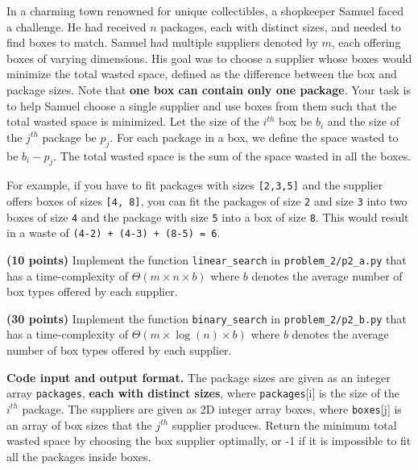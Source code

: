 \documentclass{hw}
\newcommand{\io}{\textbf{Code input and output format.} }
\begin{document}

\newpage %

\begin{problem}

In a charming town renowned for unique collectibles, a shopkeeper Samuel faced a challenge. He had received $n$ packages, each with distinct sizes, and needed to find boxes to match. Samuel had multiple suppliers denoted by $m$, each offering boxes of varying dimensions. His goal was to choose a supplier whose boxes would minimize the total wasted space, defined as the difference between the box and package sizes. Note that \textbf{one box can contain only one package}. Your task is to help Samuel choose a single supplier and use boxes from them such that the total wasted space is minimized. Let the size of the $i^{th}$ box be $b_i$ and the size of the $j^{th}$ package be $p_j$. For each package in a box, we define the space wasted to be $b_i - p_j$. The total wasted space is the sum of the space wasted in all the boxes.

For example, if you have to fit packages with sizes \texttt{[2,3,5]} and the supplier offers boxes of sizes \texttt{[4, 8]}, you can fit the packages of size \texttt{2} and size \texttt{3} into two boxes of size \texttt{4} and the package with size \texttt{5} into a box of size \texttt{8}. This would result in a waste of \texttt{(4-2) + (4-3) + (8-5) = 6}.


\textbf{(10 points)} Implement the function \texttt{linear\_search} in \texttt{problem\_2/p2\_a.py} that has a time-complexity of $\Theta(m \times n \times b)$ where $b$ denotes the average number of box types offered by each supplier.

\textbf{(30 points)} Implement the function \texttt{binary\_search} in \texttt{problem\_2/p2\_b.py} that has a time-complexity of $\Theta(m \times \log (n) \times b)$ where $b$ denotes the average number of box types offered by each supplier.

\io The package sizes are given as an integer array \texttt{packages}, \textbf{each with distinct sizes}, where \texttt{packages}[i] is the size of the $i^{th}$ package. The suppliers are given as 2D integer array boxes, where \texttt{boxes}[j] is an array of box sizes that the $j^{th}$ supplier produces. Return the minimum total wasted space by choosing the box supplier optimally, or -1 if it is impossible to fit all the packages inside boxes. 


\end{problem}
\end{document}
